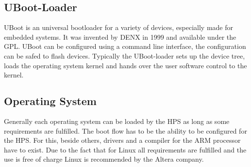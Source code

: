 \subsection{UBoot-Loader}
UBoot is an universal bootloader for a variety of devices, especially made for embedded systems. It was invented by DENX in 1999 and available under the GPL. UBoot can be configured using a command line interface, the configuration can be safed to flash devices. Typically the UBoot-loader sets up the device tree, loads the operating system kernel and hands over the user software control to the kernel.
\subsection{Operating System}
Generally each operating system can be loaded by the HPS as long as some requirements are fulfilled. The boot flow has to be the ability to be configured for the HPS. For this, beside others, drivers and a compiler for the ARM processor have to exist. Due to the fact that for Linux all requirements are fulfilled and the use is free of charge Linux is recommended by the Altera company.